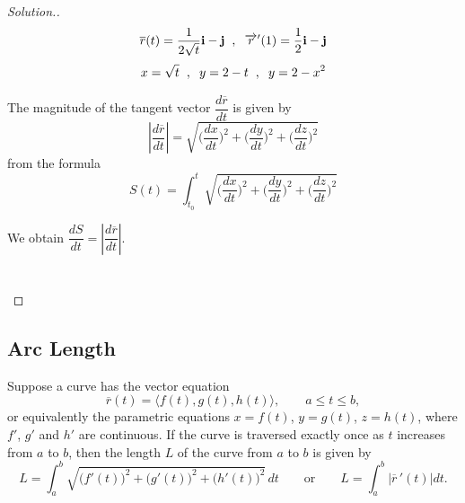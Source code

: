 \documentclass[11pt,a4paper]{article}
\theoremstyle{definition}
\newenvironment{solution}
  {\renewcommand{\qedsymbol}{}\begin{proof}[\textit{Solution}.]}
  {\end{proof}}
\begin{document}
\begin{solution}
$$\overline{r}(t) = \frac{1}{2\sqrt{t}}\textbf{i} - \textbf{j}\hspace{0.2cm} , \hspace{0.2cm} \overrightarrow{r}'(1) = \frac{1}{2}\textbf{i} - \textbf{j}$$
$$x = \sqrt{t} \hspace{0.2cm} , \hspace{0.2cm} y = 2 -t \hspace{0.2cm} , \hspace{0.2cm} y = 2 - x^2$$


\begin{figure}[H]
\centering
{}
\end{figure}

The magnitude of the tangent vector $\dfrac{d\overline{r}}{dt}$ is given by $$\left|\dfrac{d\overline{r}}{dt}\right|  = \sqrt{\Bigg(\dfrac{dx}{dt}\Bigg)^2 + \Bigg(\dfrac{dy}{dt}\Bigg)^2 + \Bigg(\dfrac{dz}{dt}\Bigg)^2}$$
from the formula
$$S(t) = \int^t_{t_0}  \sqrt{\Bigg(\dfrac{dx}{dt}\Bigg)^2 + \Bigg(\dfrac{dy}{dt}\Bigg)^2 + \Bigg(\dfrac{dz}{dt}\Bigg)^2}$$

We obtain $\dfrac{d S}{d t} = \left|\dfrac{d \overline{r}}{d t}\right|$.\\\\\\
\end{solution}

\subsection{Arc Length}
Suppose a curve has the vector equation
$$\overline{r}(t) = \big\langle f(t), g(t), h(t)\big\rangle,\qquad a\leq t\leq b,$$
or equivalently the parametric equations $x = f(t)$, $y = g(t)$, $z = h(t)$,
where $f'$, $g'$ and $h'$ are continuous. If the curve is traversed exactly once
as $t$ increases from $a$ to $b$, then the length $L$ of the curve from $a$ to
$b$ is given by
$$L = \int^b_a\sqrt{\big(f'(t)\big)^2 + \big(g'(t)\big)^2 + \big(h'(t)\big)^2}\,dt
\qquad\text{or}\qquad L = \int^b_a\left|\overline{r}\,'(t)\right|dt .$$
\end{document}
